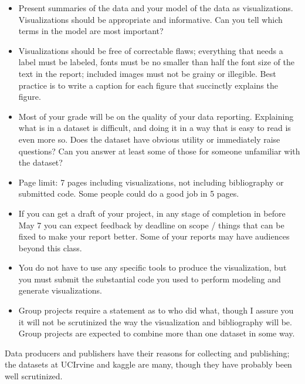 \documentclass[]{book}
\theoremstyle{definition}
\begin{document}
\begin{enumerate}
\begin{itemize}
\item  Present summaries of the data and your model of the data as visualizations.  Visualizations should be appropriate and informative.  Can you tell which terms in the model are most important?

\item Visualizations should be free of correctable flaws; everything that needs a label must be labeled, fonts must be no smaller than half the font size of the text in the report; included images must not be grainy or illegible.  Best practice is to write a caption for each figure that succinctly explains the figure.

\item Most of your grade will be on the quality of your data reporting. Explaining what is in a dataset is difficult, and doing it in a way that is easy to read is even more so.  Does the dataset have obvious utility or immediately raise questions?  Can you answer at least some of those for someone unfamiliar with the dataset?

\item Page limit: 7 pages including visualizations, not including bibliography or submitted code.  Some people could do a good job in 5 pages.

\item If you can get a draft of your project, in any stage of completion in before May 7 you can expect feedback by deadline on scope / things that can be fixed to make your report better.  Some of your reports may have audiences beyond this class.

\item You do not have to use any specific tools to produce the visualization, but you must submit the substantial code you used to perform modeling and generate visualizations.  

\item Group projects require a statement as to who did what, though I assure you it will not be scrutinized the way the visualization and bibliography will be.   Group projects are expected to combine more than one dataset in some way.
\end{itemize}

Data producers and publishers have their reasons for collecting and publishing; the datasets at UCIrvine and kaggle are many, though they have probably been well scrutinized.


\end{enumerate}
\end{document}
